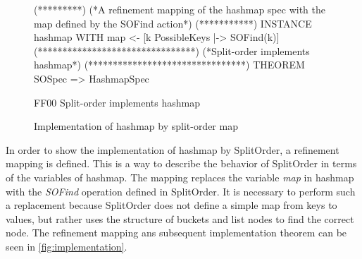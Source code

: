 \documentclass{uit-thesis}
\begin{document}
\begin{figure}
    \begin{tla}
        (*********)
(*A refinement mapping of the hashmap spec with the map defined by the SOFind action*)
(***********)
INSTANCE hashmap WITH map <- [k \in PossibleKeys |-> SOFind(k)]
(********************************)
(*Split-order implements hashmap*)
(********************************)
THEOREM SOSpec => HashmapSpec
    \end{tla}
\begin{tlatex}
\@x{}%
%
\@xx{}%
\begin{lcom}{0}%
\begin{cpar}{0}{F}{F}{0}{0}{}%
Split-order implements hashmap
\end{cpar}%
\end{lcom}%
%
\end{tlatex}
\caption{Implementation of hashmap by split-order map}
\label{fig:implementation}
\end{figure}

In order to show the implementation of hashmap by SplitOrder, a refinement mapping is defined. This is a way to describe the behavior of SplitOrder in terms of the variables of hashmap. The mapping replaces the variable \textit{map} in hashmap with the \textit{SOFind} operation defined in SplitOrder. It is necessary to perform such a replacement because SplitOrder does not define a simple map from keys to values, but rather uses the structure of buckets and list nodes to find the correct node. The refinement mapping ans subsequent implementation theorem can be seen in \autoref{fig:implementation}.
\end{document}
